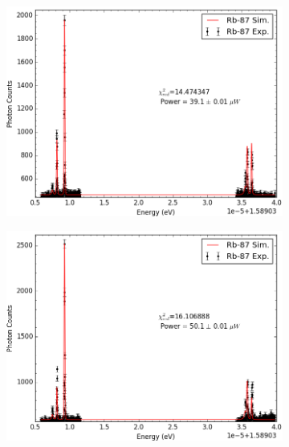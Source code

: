 \pagebreak
\begin{figure}[h]
	\centering
    \begin{subfigure}[b]{0.49\textwidth}
        \includegraphics[width=\textwidth]{Graphics/113_114.png}
        \caption{}
        \label{}
    \end{subfigure}
    \begin{subfigure}[b]{0.49\textwidth}
        \includegraphics[width=\textwidth]{Graphics/115_116.png}
        \caption{}
    \end{subfigure}
    

\end{figure}
